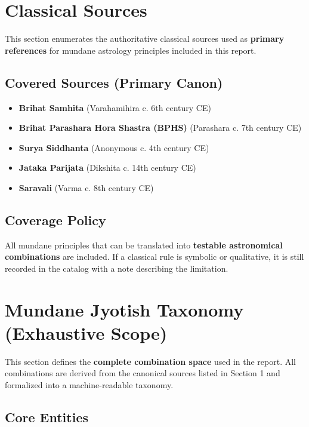 \documentclass[
  11pt,
  a4paper,
  oneside,
  openany]{report}
\providecommand{\tightlist}{%
  \setlength{\itemsep}{0pt}\setlength{\parskip}{0pt}}\usepackage{longtable,booktabs,array}
\begin{document}
\chapter{Classical Sources}\label{classical-sources}

This section enumerates the authoritative classical sources used as
\textbf{primary references} for mundane astrology principles included in
this report.

\section{Covered Sources (Primary
Canon)}\label{covered-sources-primary-canon}

\begin{itemize}
\tightlist
\item
  \textbf{Brihat Samhita} (Varahamihira c. 6th century CE)
\item
  \textbf{Brihat Parashara Hora Shastra (BPHS)} (Parashara c. 7th
  century CE)
\item
  \textbf{Surya Siddhanta} (Anonymous c. 4th century CE)
\item
  \textbf{Jataka Parijata} (Dikshita c. 14th century CE)
\item
  \textbf{Saravali} (Varma c. 8th century CE)
\end{itemize}

\section{Coverage Policy}\label{coverage-policy}

All mundane principles that can be translated into \textbf{testable
astronomical combinations} are included. If a classical rule is symbolic
or qualitative, it is still recorded in the catalog with a note
describing the limitation.

\chapter{Mundane Jyotish Taxonomy (Exhaustive
Scope)}\label{mundane-jyotish-taxonomy-exhaustive-scope}

This section defines the \textbf{complete combination space} used in the
report. All combinations are derived from the canonical sources listed
in Section 1 and formalized into a machine-readable taxonomy.

\section{Core Entities}\label{core-entities}
\end{document}
